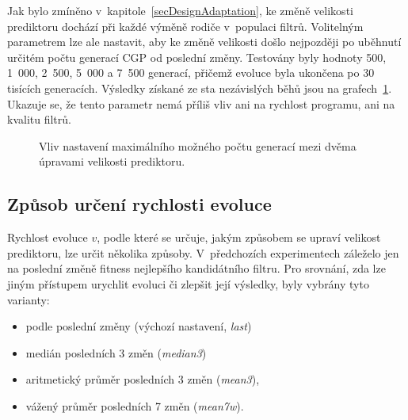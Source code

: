 Jak bylo zmíněno v~kapitole~\ref{secDesignAdaptation}, ke změně velikosti prediktoru dochází při každé výměně rodiče v~populaci filtrů. Volitelným parametrem lze ale nastavit, aby ke změně velikosti došlo nejpozději po uběhnutí určitém počtu generací CGP od poslední změny. Testovány byly hodnoty 500, 1~000, 2~500, 5~000 a 7~500 generací, přičemž evoluce byla ukončena po 30 tisících generacích. Výsledky získané ze sta nezávislých běhů jsou na grafech~\ref{plotInterval-30kg}. Ukazuje se, že tento parametr nemá příliš vliv ani na rychlost programu, ani na kvalitu filtrů.

\begin{figure}[htb]
    \centering
    \captionsetup{aboveskip=0pt}
    \caption{Vliv nastavení maximálního možného počtu generací mezi dvěma úpravami velikosti prediktoru.}
    \label{plotInterval-30kg}
\end{figure}

\subsection{Způsob určení rychlosti evoluce}

Rychlost evoluce $v$, podle které se určuje, jakým způsobem se upraví velikost prediktoru, lze určit několika způsoby. V~předchozích experimentech záleželo jen na poslední změně fitness nejlepšího kandidátního filtru. Pro srovnání, zda lze jiným přístupem urychlit evoluci či zlepšit její výsledky, byly vybrány tyto varianty:

\begin{itemize}
    \item podle poslední změny (výchozí nastavení, \emph{last})
    \item medián posledních 3 změn (\emph{median3})
    \item aritmetický průměr posledních 3 změn (\emph{mean3}),
    \item vážený průměr posledních 7 změn (\emph{mean7w}).
\end{itemize}

